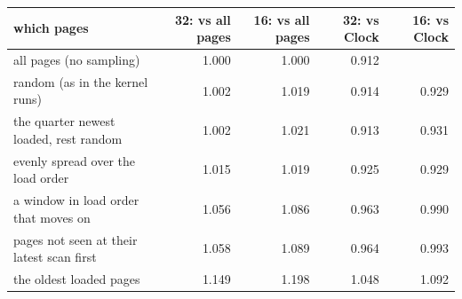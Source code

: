 \begin{tabular}{lrrrr}
\toprule
which pages & 32: vs all pages & 16: vs all pages & 32: vs Clock & 16: vs Clock \\
\midrule
all pages (no sampling) & 1.000 & 1.000 & 0.912 &  \\
random (as in the kernel runs) & 1.002 & 1.019 & 0.914 & 0.929 \\
the quarter newest loaded, rest random & 1.002 & 1.021 & 0.913 & 0.931 \\
evenly spread over the load order & 1.015 & 1.019 & 0.925 & 0.929 \\
a window in load order that moves on & 1.056 & 1.086 & 0.963 & 0.990 \\
pages not seen at their latest scan first & 1.058 & 1.089 & 0.964 & 0.993 \\
the oldest loaded pages & 1.149 & 1.198 & 1.048 & 1.092 \\
\bottomrule
\end{tabular}
